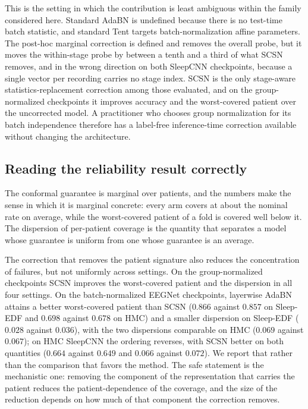 This is the setting in which the contribution is least ambiguous within the
family considered here. Standard AdaBN is undefined because there is no
test-time batch statistic, and standard Tent targets batch-normalization
affine parameters. The post-hoc marginal correction is defined and removes
the overall probe, but it moves the
within-stage probe by between a tenth and a third of what SCSN removes, and
in the wrong direction on both SleepCNN checkpoints, because a single vector
per recording carries no stage index. SCSN is the only stage-aware
statistics-replacement correction among those evaluated, and on the
group-normalized checkpoints it improves accuracy and the worst-covered
patient over the uncorrected model. A practitioner who chooses group
normalization for its batch independence therefore has a label-free
inference-time correction available without changing the architecture.

\subsection{Reading the reliability result correctly}

The conformal guarantee is marginal over patients, and the numbers make the
sense in which it is marginal concrete: every arm covers at about the nominal
rate on average, while the worst-covered patient of a fold is covered well
below it. The dispersion of per-patient coverage is the quantity that
separates a model whose guarantee is uniform from one whose guarantee is an
average.

The correction that removes the patient signature also reduces the
concentration of failures, but not uniformly across settings. On the
group-normalized checkpoints SCSN improves the worst-covered patient and the
dispersion in all four settings. On
the batch-normalized EEGNet checkpoints, layerwise AdaBN attains a better
worst-covered patient than SCSN ($0.866$ against $0.857$ on Sleep-EDF and
$0.698$ against $0.678$ on HMC) and a smaller dispersion on Sleep-EDF ($0.028$
against $0.036$), with the two dispersions comparable on HMC ($0.069$ against
$0.067$); on HMC SleepCNN the ordering reverses, with SCSN better on both
quantities ($0.664$ against $0.649$ and $0.066$ against $0.072$). We report
that rather than the comparison that favors the method. The safe statement is the mechanistic one: removing the
component of the representation that carries the patient reduces the
patient-dependence of the coverage, and the size of the reduction depends on
how much of that component the correction removes.

